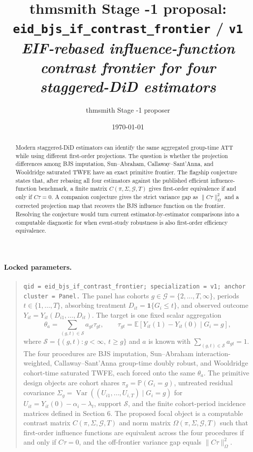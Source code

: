 \documentclass[11pt]{article}
\title{thmsmith Stage -1 proposal: \texttt{eid\_bjs\_if\_contrast\_frontier} / \texttt{v1}%
  \\ \large\textit{EIF-rebased influence-function contrast frontier for four staggered-DiD estimators}}
\author{thmsmith Stage -1 proposer}
\date{\today}
\newcommand{\E}{\mathbb{E}}
\renewcommand{\Pr}{\mathbb{P}}
\newcommand{\one}{\mathbf{1}}
\theoremstyle{definition}
\theoremstyle{plain}
\theoremstyle{remark}
\begin{document}
\maketitle


\paragraph{Locked parameters.}
\begin{quote}
\texttt{qid = eid\_bjs\_if\_contrast\_frontier; specialization = v1; anchor cluster = Panel.}
The panel has cohorts $g\in\mathcal G=\{2,\ldots,T,\infty\}$, periods
$t\in\{1,\ldots,T\}$, absorbing treatment $D_{it}=\one\{G_i\le t\}$, and
observed outcome $Y_{it}=Y_{it}(D_{i1},\ldots,D_{it})$.  The target is one
fixed scalar aggregation
\[
  \theta_a=\sum_{(g,t)\in\mathcal S} a_{gt}\tau_{gt},\qquad
  \tau_{gt}=\E[Y_{it}(1)-Y_{it}(0)\mid G_i=g],
\]
where $\mathcal S=\{(g,t):g<\infty,\ t\ge g\}$ and $a$ is known with
$\sum_{(g,t)\in\mathcal S}a_{gt}=1$.  The four procedures are BJS imputation,
Sun--Abraham interaction-weighted, Callaway--Sant'Anna group-time doubly
robust, and Wooldridge cohort-time saturated TWFE, each forced onto the same
$\theta_a$.  The primitive design objects are cohort shares
$\pi_g=\Pr(G_i=g)$, untreated residual covariance
$\Sigma_g=\operatorname{Var}((U_{i1},\ldots,U_{i,T})\mid G_i=g)$ for
$U_{it}=Y_{it}(0)-\alpha_i-\lambda_t$, support $\mathcal S$, and the finite
cohort-period incidence matrices defined in Section 6.  The proposed focal
object is a computable contrast matrix $C(\pi,\Sigma,\mathcal G,T)$ and norm
matrix $\Omega(\pi,\Sigma,\mathcal G,T)$ such that first-order influence
functions are equivalent across the four procedures if and only if
$C\tau=0$, and the off-frontier variance gap equals
$\|C\tau\|_{\Omega}^{2}$.
\end{quote}

\begin{abstract}
Modern staggered-DiD estimators can identify the same aggregated
group-time ATT while using different first-order projections.  The question is
whether the projection differences among BJS imputation, Sun--Abraham,
Callaway--Sant'Anna, and Wooldridge saturated TWFE have an exact primitive
frontier.  The flagship conjecture states that, after rebasing all four
estimators against the published efficient influence-function benchmark, a
finite matrix $C(\pi,\Sigma,\mathcal G,T)$ gives first-order equivalence if
and only if $C\tau=0$.  A companion conjecture gives the strict variance gap
as $\|C\tau\|_{\Omega}^{2}$ and a corrected projection map that recovers the
BJS influence function on the frontier.  Resolving the conjecture would turn
current estimator-by-estimator comparisons into a computable diagnostic for
when event-study robustness is also first-order efficiency equivalence.
\end{abstract}
\end{document}
